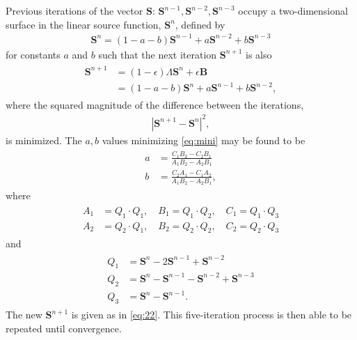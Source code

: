 \documentclass[12pt]{article}
\begin{document}
Previous iterations of the vector $\mathbf{S}$: $\mathbf{S}^{n-1}, \mathbf{S}^{n-2}, \mathbf{S}^{n-3}$ occupy a two-dimensional surface in the linear source function, $\mathbf{S}^n$, defined by
\begin{align}
\mathbf{S}^n = (1 - a - b) \mathbf{S}^{n-1} + a \mathbf{S}^{n-2} + b \mathbf{S}^{n-3}
\end{align}
for constants $a$ and $b$ such that the next iteration $\mathbf{S}^{n + 1}$ is also
\begin{align}
\begin{split}
\mathbf{S}^{n + 1}
&= (1 - \epsilon) \Lambda \mathbf{S}^n + \epsilon \mathbf{B}
\\
& = (1 - a - b) \mathbf{S}^n + a \mathbf{S}^{n - 1} + b \mathbf{S}^{n - 2},
\label{eq:22}
\end{split}
\end{align}
where the squared magnitude of the difference between the iterations,
\begin{align}
| \mathbf{S}^{n + 1} - \mathbf{S}^n |^2,
\label{eq:mini}
\end{align}
is minimized. The $a, b$ values minimizing \autoref{eq:mini} may be found to be
\begin{align}
\begin{split}
a &= \frac{C_1 B_2 - C_2 B_1}{A_1 B_2 - A_2 B_1}
\\
b &= \frac{C_2 A_1 - C_1 A_2}{A_1 B_2 - A_2 B_1},
\end{split}
\end{align}
where
\begin{align}
\begin{split}
A_1 &= Q_1 \cdot Q_1, \quad B_1 = Q_1 \cdot Q_2, \quad C_1 = Q_1 \cdot Q_3
\\
A_2 &= Q_2 \cdot Q_1, \quad B_2 = Q_2 \cdot Q_2, \quad C_2 = Q_2 \cdot Q_3
\end{split}
\end{align}
and
\begin{align}
\begin{split}
Q_1 &= \mathbf{S}^n - 2 \mathbf{S}^{n - 1} + \mathbf{S}^{n - 2}
\\
Q_2 &= \mathbf{S}^n - \mathbf{S}^{n - 1} - \mathbf{S}^{n - 2} + \mathbf{S}^{n - 3}
\\
Q_3 &= \mathbf{S}^n - \mathbf{S}^{n - 1}.
\end{split}
\end{align}
The new $\mathbf{S}^{n + 1}$ is given as in \autoref{eq:22}. This five-iteration process is then able to be repeated until convergence.
\end{document}
